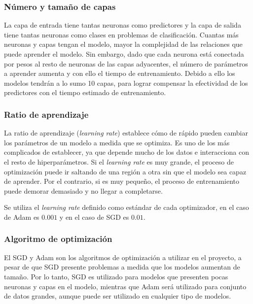     \subsubsection{N\'{u}mero y tama\~{n}o de capas}
    
    La capa de entrada tiene tantas neuronas como predictores y la capa de salida tiene tantas neuronas como clases en problemas de clasificaci\'{o}n. Cuantas m\'{a}s neuronas y capas tengan el modelo, mayor la complejidad de las relaciones que puede aprender el modelo. Sin embargo, dado que cada neurona est\'{a} conectada por pesos al resto de neuronas de las capas adyacentes, el n\'{u}mero de par\'{a}metros a aprender aumenta y con ello el tiempo de entrenamiento. Debido a ello los modelos tendr\'{a}n a lo sumo 10 capas, para lograr compensar la efectividad de los predictores con el tiempo estimado de entrenamiento.
    
    \subsubsection{Ratio de aprendizaje}
    
    La ratio de aprendizaje (\textit{learning rate}) establece c\'{o}mo de r\'{a}pido pueden cambiar los par\'{a}metros de un modelo a medida que se optimiza. Es uno de los m\'{a}s complicados de establecer, ya que depende mucho de los datos e interacciona con el resto de hiperpar\'{a}metros. Si el \textit{learning rate} es muy grande, el proceso de optimizaci\'{o}n puede ir saltando de una regi\'{o}n a otra sin que el modelo sea capaz de aprender. Por el contrario, si es muy peque\~{n}o, el proceso de entrenamiento puede demorar demasiado y no llegar a completarse.
    
    Se utiliza el \textit{learning rate} definido como est\'{a}ndar de cada optimizador, en el caso de Adam es $0.001$ y en el caso de SGD es $0.01$.
    
    \subsubsection{Algoritmo de optimizaci\'{o}n}
    
    El SGD y Adam son los algoritmos de optimizaci\'{o}n a utilizar en el proyecto, a pesar de que SGD presente problemas a medida que los modelos aumentan de tama\~{n}o. Por lo tanto, SGD es utilizado para modelos que presenten pocas neuronas y capas en el modelo, mientras que Adam ser\'{a} utilizado para conjunto de datos grandes, aunque puede ser utilizado en cualquier tipo de modelos.
    
